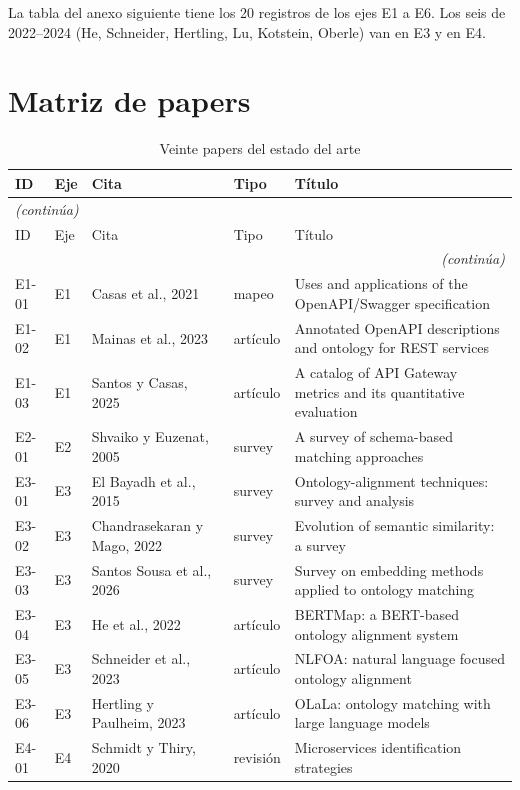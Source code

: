 La tabla del anexo siguiente tiene los 20 registros de los ejes E1 a E6. Los seis de 2022--2024 (He, Schneider, Hertling, Lu, Kotstein, Oberle) van en E3 y en E4.

\chapter{Matriz de papers}
\label{anexo:papers}

\begin{longtable}{@{}p{}p{}p{}p{}p{}@{}}
\caption{Veinte papers del estado del arte} \label{tab:anexo-b} \\
\toprule
ID & Eje & Cita & Tipo & Título \\
\midrule
\endfirsthead
\multicolumn{5}{l}{\textit{(continúa)}} \\
\midrule
ID & Eje & Cita & Tipo & Título \\
\midrule
\endhead
\midrule
\multicolumn{5}{r}{\textit{(continúa)}} \\
\endfoot
\bottomrule
\endlastfoot
E1-01 & E1 & Casas et al., 2021 & mapeo & Uses and applications of the OpenAPI/Swagger specification \\
E1-02 & E1 & Mainas et al., 2023 & artículo & Annotated OpenAPI descriptions and ontology for REST services \\
E1-03 & E1 & Santos y Casas, 2025 & artículo & A catalog of API Gateway metrics and its quantitative evaluation \\
E2-01 & E2 & Shvaiko y Euzenat, 2005 & survey & A survey of schema-based matching approaches \\
E3-01 & E3 & El Bayadh et al., 2015 & survey & Ontology-alignment techniques: survey and analysis \\
E3-02 & E3 & Chandrasekaran y Mago, 2022 & survey & Evolution of semantic similarity: a survey \\
E3-03 & E3 & Santos Sousa et al., 2026 & survey & Survey on embedding methods applied to ontology matching \\
E3-04 & E3 & He et al., 2022 & artículo & BERTMap: a BERT-based ontology alignment system \\
E3-05 & E3 & Schneider et al., 2023 & artículo & NLFOA: natural language focused ontology alignment \\
E3-06 & E3 & Hertling y Paulheim, 2023 & artículo & OLaLa: ontology matching with large language models \\
E4-01 & E4 & Schmidt y Thiry, 2020 & revisión & Microservices identification strategies \\

\end{longtable}
